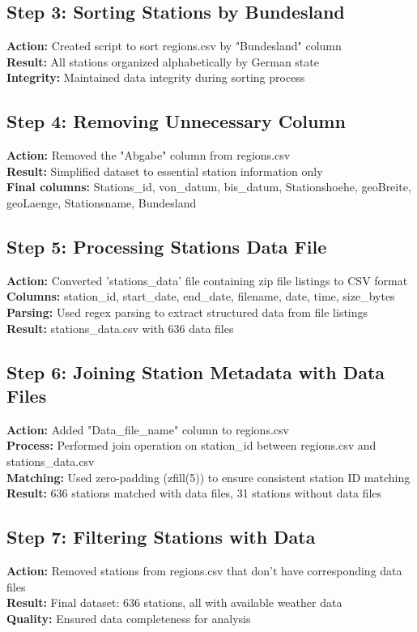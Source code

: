 \documentclass[11pt,a4paper]{article}
\begin{document}
\subsection{Step 3: Sorting Stations by Bundesland}
\textbf{Action:} Created script to sort regions.csv by "Bundesland" column\\
\textbf{Result:} All stations organized alphabetically by German state\\
\textbf{Integrity:} Maintained data integrity during sorting process

\subsection{Step 4: Removing Unnecessary Column}
\textbf{Action:} Removed the "Abgabe" column from regions.csv\\
\textbf{Result:} Simplified dataset to essential station information only\\
\textbf{Final columns:} Stations\_id, von\_datum, bis\_datum, Stationshoehe, geoBreite, geoLaenge, Stationsname, Bundesland

\subsection{Step 5: Processing Stations Data File}
\textbf{Action:} Converted 'stations\_data' file containing zip file listings to CSV format\\
\textbf{Columns:} station\_id, start\_date, end\_date, filename, date, time, size\_bytes\\
\textbf{Parsing:} Used regex parsing to extract structured data from file listings\\
\textbf{Result:} stations\_data.csv with 636 data files

\subsection{Step 6: Joining Station Metadata with Data Files}
\textbf{Action:} Added "Data\_file\_name" column to regions.csv\\
\textbf{Process:} Performed join operation on station\_id between regions.csv and stations\_data.csv\\
\textbf{Matching:} Used zero-padding (zfill(5)) to ensure consistent station ID matching\\
\textbf{Result:} 636 stations matched with data files, 31 stations without data files

\subsection{Step 7: Filtering Stations with Data}
\textbf{Action:} Removed stations from regions.csv that don't have corresponding data files\\
\textbf{Result:} Final dataset: 636 stations, all with available weather data\\
\textbf{Quality:} Ensured data completeness for analysis
\end{document}

